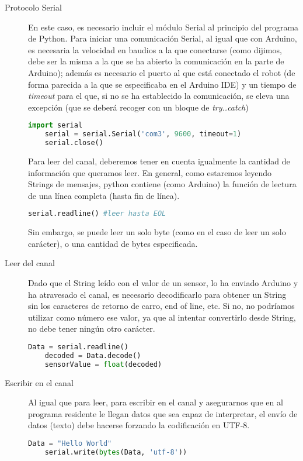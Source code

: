 \begin{description}
	\item [Protocolo Serial] En este caso, es necesario incluir el módulo Serial al principio del programa de Python. Para iniciar una comunicación Serial, al igual que con Arduino, es necesaria la velocidad en baudios a la que conectarse (como dijimos, debe ser la misma a la que se ha abierto la comunicación en la parte de Arduino); además es necesario el puerto al que está conectado el robot (de forma parecida a la que se especificaba en el Arduino IDE) y un tiempo de \textit{timeout} para el que, si no se ha establecido la comunicación, se eleva una excepción (que se deberá recoger con un bloque de \textit{try..catch})	
	\begin{lstlisting}[language=python]	
	import serial
	serial = serial.Serial('com3', 9600, timeout=1)
	serial.close()
	\end{lstlisting}
	Para leer del canal, deberemos tener en cuenta igualmente la cantidad de información que queramos leer. En general, como estaremos leyendo Strings de mensajes, python contiene (como Arduino) la función de lectura de una línea completa (hasta fin de línea). 
	\begin{lstlisting}[language=python]
	serial.readline() #leer hasta EOL		
	\end{lstlisting}
	Sin embargo, se puede leer un solo byte (como en el caso de leer un solo carácter), o una cantidad de bytes especificada.
	
	\item [Leer del canal] Dado que el String leído con el valor de un sensor, lo ha enviado Arduino y ha atravesado el canal, es necesario decodificarlo para obtener un String sin los caracteres de retorno de carro, end of line, etc. Si no, no podríamos utilizar como número ese valor, ya que al intentar convertirlo desde String, no debe tener ningún otro carácter.
	\begin{lstlisting}[language=python]	
	Data = serial.readline()
	decoded = Data.decode()
	sensorValue = float(decoded)
	\end{lstlisting}
	
	
	\item [Escribir en el canal] Al igual que para leer, para escribir en el canal y asegurarnos que en al programa residente le llegan datos que sea capaz de interpretar, el envío de datos (texto) debe hacerse forzando la codificación en UTF-8.
	\begin{lstlisting}[language=python]
	Data = "Hello World"
	serial.write(bytes(Data, 'utf-8'))
	\end{lstlisting}

\end{description}

